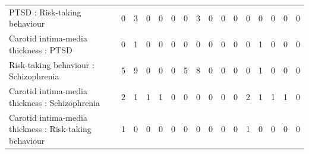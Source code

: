 \begin{table}[ht]
\begin{tabular}{lrrrrrrrrrrrrrrr}
  PTSD : Risk-taking behaviour &   0 &   3 &   0 &   0 &   0 &   0 &   3 &   0 &   0 &   0 &   0 &   0 &   0 &   0 &   0 \\ 
  Carotid intima-media thickness : PTSD &   0 &   1 &   0 &   0 &   0 &   0 &   0 &   0 &   0 &   0 &   0 &   1 &   0 &   0 &   0 \\ 
  Risk-taking behaviour : Schizophrenia &   5 &   9 &   0 &   0 &   0 &   5 &   8 &   0 &   0 &   0 &   0 &   1 &   0 &   0 &   0 \\ 
  Carotid intima-media thickness : Schizophrenia &   2 &   1 &   1 &   1 &   0 &   0 &   0 &   0 &   0 &   0 &   2 &   1 &   1 &   1 &   0 \\ 
  Carotid intima-media thickness : Risk-taking behaviour &   1 &   0 &   0 &   0 &   0 &   0 &   0 &   0 &   0 &   0 &   1 &   0 &   0 &   0 &   0 \\ 
   \hline
\end{tabular}
\end{table}

